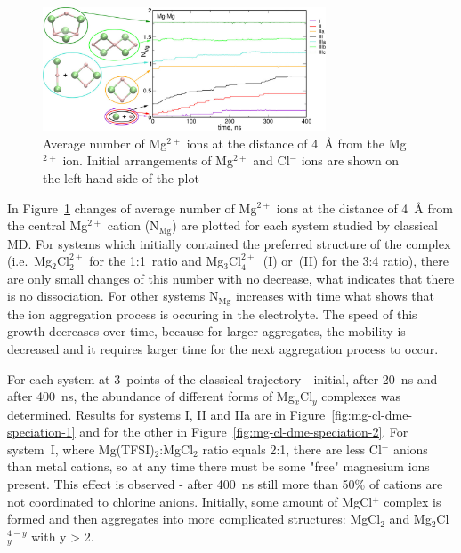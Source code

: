 \begin{figure}[ht]
    \centering
    \includegraphics[width=0.75\textwidth]{img/3-structural-data-from-md-simulations/3-mg-cl-dme/average-mg.png}
    \caption{Average number of Mg$^{2+}$ ions at the distance of 4~{\AA} from the Mg$^{2+}$ ion. Initial arrangements of Mg$^{2+}$ and Cl$^{-}$ ions are shown on the left hand side of the plot}
    \label{fig:mg-cl-dme-average-mg}
\end{figure}

In Figure~\ref{fig:mg-cl-dme-average-mg} changes of average number of Mg$^{2+}$ ions at the distance of 4~{\AA} from the central Mg$^{2+}$ cation (N$_{\text{Mg}}$) are plotted for each system studied by classical MD. For systems which initially contained the preferred structure of the complex (i.e.~Mg$_2$Cl$_2^{2+}$ for the 1:1~ratio and Mg$_3$Cl$_4^{2+}$~(I) or~(II) for the 3:4 ratio), there are only small changes of this number with no decrease, what indicates that there is no dissociation. For other systems N$_{\text{Mg}}$ increases with time what shows that the ion aggregation process is occuring in the electrolyte. The speed of this growth decreases over time, because for larger aggregates, the mobility is decreased and it requires larger time for the next aggregation process to occur.

For each system at 3~points of the classical trajectory - initial, after 20~ns and after 400~ns, the abundance of different forms of Mg$_x$Cl$_y$ complexes was determined. Results for systems I, II and IIa are in Figure~\ref{fig:mg-cl-dme-speciation-1} and for the other in Figure~\ref{fig:mg-cl-dme-speciation-2}. For system~I, where Mg(TFSI)$_2$:MgCl$_2$ ratio equals 2:1, there are less Cl$^{-}$ anions than metal cations, so at any time there must be some "free" magnesium ions present. This effect is observed - after 400~ns still more than 50\% of cations are not coordinated to chlorine anions. Initially, some amount of MgCl$^{+}$ complex is formed and then aggregates into more complicated structures: MgCl$_2$ and Mg$_2$Cl$_y^{4-y}$ with y > 2.

